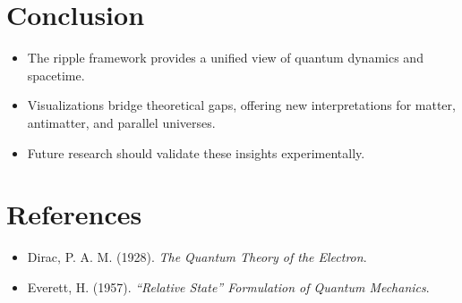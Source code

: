 \documentclass[12pt]{article}
\begin{document}
\section{Conclusion}
\begin{itemize}
    \item The ripple framework provides a unified view of quantum dynamics and spacetime.
    \item Visualizations bridge theoretical gaps, offering new interpretations for matter, antimatter, and parallel universes.
    \item Future research should validate these insights experimentally.
\end{itemize}

\section*{References}
\begin{itemize}
    \item Dirac, P. A. M. (1928). \textit{The Quantum Theory of the Electron}.
    \item Everett, H. (1957). \textit{``Relative State'' Formulation of Quantum Mechanics}.
\end{itemize}
\end{document}
